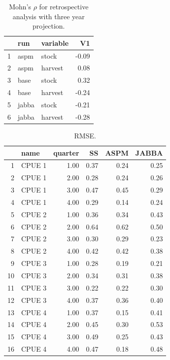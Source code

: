 \documentclass[a4paper]{article}
\begin{document}
\begin{table}[ht]
\caption{Mohn's $\rho$ for retrospective analysis with three year projection.}  
\label{tab:proj}
\centering
\begin{tabular}{rllr}
  \hline
 & run & variable & V1 \\ 
  \hline
1 & aspm & stock & -0.09 \\ 
  2 & aspm & harvest & 0.08 \\ 
  3 & base & stock & 0.32 \\ 
  4 & base & harvest & -0.24 \\ 
  5 & jabba & stock & -0.21 \\ 
  6 & jabba & harvest & -0.28 \\
   \hline
\end{tabular}
\end{table}



\begin{table}[ht]
\caption{RMSE.}  
\label{tab:rmse}
\centering
\begin{tabular}{rlrrrr}
  \hline
 & name & quarter & SS & ASPM & JABBA \\ 
  \hline
  1 & CPUE 1 & 1.00 & 0.37 & 0.24 & 0.25 \\ 
  2 & CPUE 1 & 2.00 & 0.28 & 0.24 & 0.26 \\ 
  3 & CPUE 1 & 3.00 & 0.47 & 0.45 & 0.29 \\ 
  4 & CPUE 1 & 4.00 & 0.29 & 0.14 & 0.24 \\ 
  5 & CPUE 2 & 1.00 & 0.36 & 0.34 & 0.43 \\ 
  6 & CPUE 2 & 2.00 & 0.64 & 0.62 & 0.50 \\ 
  7 & CPUE 2 & 3.00 & 0.30 & 0.29 & 0.23 \\ 
  8 & CPUE 2 & 4.00 & 0.42 & 0.42 & 0.38 \\ 
  9 & CPUE 3 & 1.00 & 0.28 & 0.19 & 0.21 \\ 
  10 & CPUE 3 & 2.00 & 0.34 & 0.31 & 0.38 \\ 
  11 & CPUE 3 & 3.00 & 0.22 & 0.22 & 0.30 \\ 
  12 & CPUE 3 & 4.00 & 0.37 & 0.36 & 0.40 \\ 
  13 & CPUE 4 & 1.00 & 0.37 & 0.15 & 0.41 \\ 
  14 & CPUE 4 & 2.00 & 0.45 & 0.30 & 0.53 \\ 
  15 & CPUE 4 & 3.00 & 0.49 & 0.25 & 0.43 \\ 
  16 & CPUE 4 & 4.00 & 0.47 & 0.18 & 0.48 \\ 
   \hline
\end{tabular}
\end{table}
\end{document}
